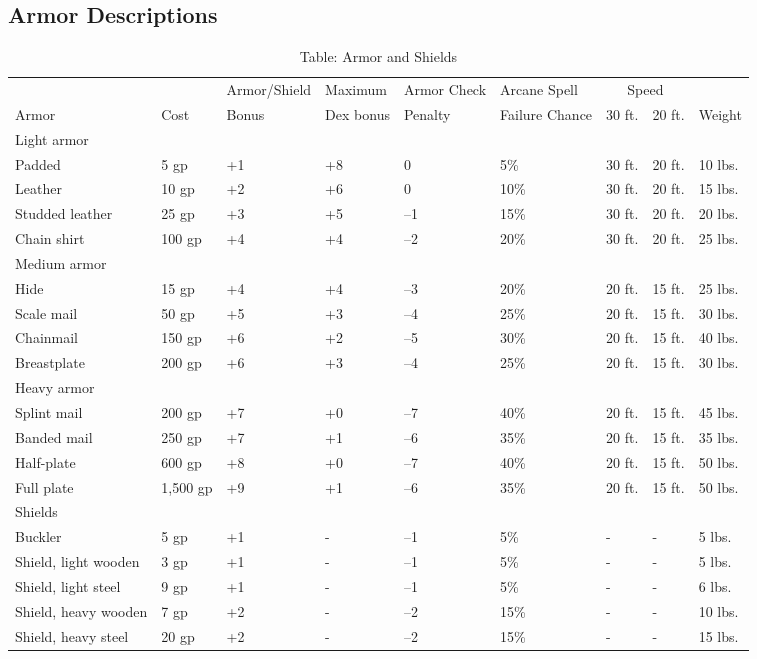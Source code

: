 \subsection{Armor Descriptions}

\begin{table}[]
\sffamily
\caption{Table: Armor and Shields}
\begin{tabular}{lllllllll}
      &      & Armor/Shield & Maximum    & Armor Check & Arcane Spell   & \multicolumn{2}{c}{Speed} &  \\
Armor & Cost &        Bonus & Dex bonus  & Penalty     & Failure Chance & 30 ft. & 20 ft. & Weight\\
Light armor \\
 Padded& 5 gp& +1& +8& 0& 5\%& 30 ft.& 20 ft.& 10 lbs. \\
 Leather& 10 gp& +2& +6& 0& 10\%& 30 ft.& 20 ft.& 15 lbs. \\
 Studded leather& 25 gp& +3& +5& –1& 15\%& 30 ft.& 20 ft.& 20 lbs. \\
 Chain shirt& 100 gp& +4& +4& –2& 20\%& 30 ft.& 20 ft.& 25 lbs. \\
 Medium armor   \\
 Hide& 15 gp& +4& +4& –3& 20\%& 20 ft.& 15 ft.& 25 lbs. \\
 Scale mail& 50 gp& +5& +3& –4& 25\%& 20 ft.& 15 ft.& 30 lbs. \\
 Chainmail& 150 gp& +6& +2& –5& 30\%& 20 ft.& 15 ft.& 40 lbs. \\
 Breastplate& 200 gp& +6& +3& –4& 25\%& 20 ft.& 15 ft.& 30 lbs. \\
 Heavy armor   \\
 Splint mail& 200 gp& +7& +0& –7& 40\%& 20 ft.& 15 ft.& 45 lbs. \\
 Banded mail& 250 gp& +7& +1& –6& 35\%& 20 ft.& 15 ft.& 35 lbs. \\
 Half-plate& 600 gp& +8& +0& –7& 40\%& 20 ft.& 15 ft.& 50 lbs. \\
 Full plate& 1,500 gp& +9& +1& –6& 35\%& 20 ft.& 15 ft.& 50 lbs. \\
 Shields   \\
 Buckler& 5 gp& +1& -& –1& 5\%& -& -& 5 lbs. \\
 Shield, light wooden& 3 gp& +1& -& –1& 5\%& -& -& 5 lbs. \\
 Shield, light steel& 9 gp& +1& -& –1& 5\%& -& -& 6 lbs. \\
 Shield, heavy wooden& 7 gp& +2& -& –2& 15\%& -& -& 10 lbs. \\
 Shield, heavy steel& 20 gp& +2& -& –2& 15\%& -& -& 15 lbs. \\

\end{tabular}
\end{table}
